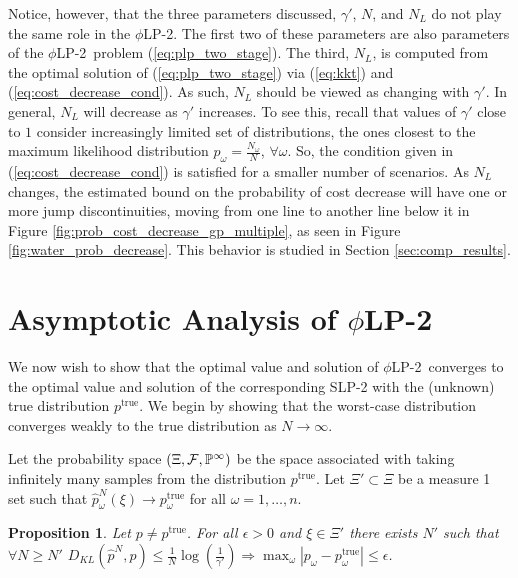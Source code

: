 \documentclass[11pt]{article}
\renewcommand{\P}{\mathbb{P}}
\newcommand{\ptrue}{p^{\text{true}}}
\newtheorem{proposition}[theorem]{Proposition}
\newcommand{\plp}{$\phi$LP-2}
\begin{document}
Notice, however, that the three parameters discussed, $\gamma'$, $N$, and $N_L$ do not play the same role in the \plp.
The first two of these parameters are also parameters of the \plp\ problem (\ref{eq:plp_two_stage}).
The third, $N_L$, is computed from the optimal solution of (\ref{eq:plp_two_stage}) via (\ref{eq:kkt}) and (\ref{eq:cost_decrease_cond}).
As such, $N_L$ should be viewed as changing with $\gamma'$.
In general, $N_L$ will decrease as $\gamma'$ increases. To see this, recall that values of  $\gamma'$ close to $1$ consider increasingly limited set of distributions, the ones closest to the maximum likelihood distribution $p_\omega = \frac{N_\omega}{N}$, $\forall \omega$. So, the condition given in (\ref{eq:cost_decrease_cond}) is satisfied for a smaller number of scenarios. As $N_L$ changes, the estimated bound on the probability of cost decrease will have one or more jump discontinuities, moving from one line to another line below it in Figure \ref{fig:prob_cost_decrease_gp_multiple}, as seen in Figure \ref{fig:water_prob_decrease}.
This behavior is studied in Section \ref{sec:comp_results}.

\section{Asymptotic Analysis of \plp}
\label{sec:epiconvergence}

We now wish to show that the optimal value and solution of \plp\ converges to the optimal value and solution of the corresponding SLP-2 with the (unknown) true distribution $\ptrue$.
We begin by showing that the worst-case distribution converges weakly to the true distribution as $N \rightarrow \infty$.

Let the probability space $(\Xi,{\cal F},\P^\infty)$ be the space associated with taking infinitely many samples from the distribution $\ptrue$.
Let $\Xi' \subset \Xi$ be a measure 1 set such that $\hat{p}^N_\omega(\xi) \rightarrow \ptrue_\omega$ for all $\omega = 1, \dots, n$.

\begin{proposition} \label{prop:weak_conv}
	Let $p \neq \ptrue$.  For all $\epsilon > 0$ and $\xi \in \Xi'$ there exists $N'$ such that $\forall N \geq N'$ $D_{KL}(\hat{p}^N,p) \leq \frac{1}{N} \log\left(\frac{1}{\gamma'}\right) \Rightarrow \max_\omega |p_\omega - \ptrue_\omega| \leq \epsilon$.
\end{proposition}
\end{document}
